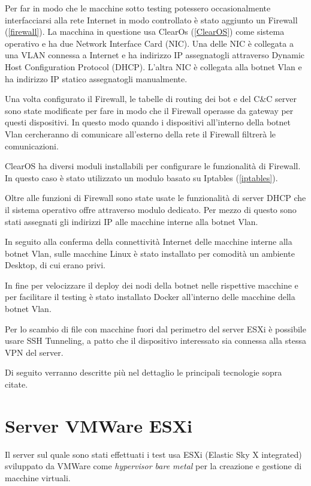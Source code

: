 Per far in modo che le macchine sotto testing potessero occasionalmente interfacciarsi alla rete Internet in modo controllato è stato aggiunto un Firewall (\ref{firewall}). La macchina in questione usa  ClearOs (\ref{ClearOS}) come sistema operativo e ha due Network Interface Card (NIC).
Una delle NIC è collegata a una VLAN connessa a Internet e ha indirizzo IP assegnatogli attraverso Dynamic Host Configuration Protocol (DHCP). L'altra NIC è collegata alla botnet Vlan e ha indirizzo IP statico assegnatogli manualmente. 

Una volta configurato il Firewall, le tabelle di routing dei bot e del C\&C server sono state modificate per fare in modo che il Firewall operasse da gateway per questi dispositivi. In questo modo quando i dispositivi all'interno della botnet Vlan cercheranno di comunicare all'esterno della rete il Firewall filtrerà le comunicazioni.

ClearOS ha diversi moduli installabili per configurare le funzionalità di Firewall. In questo caso è stato utilizzato un modulo basato su Iptables (\ref{iptables}).
    
Oltre alle funzioni di Firewall sono state usate le funzionalità di server DHCP che il sistema operativo offre attraverso modulo dedicato. Per mezzo di  questo sono stati assegnati gli indirizzi IP alle macchine interne alla botnet Vlan.

In seguito alla conferma della connettività  Internet delle macchine interne alla botnet Vlan,  sulle macchine Linux è stato installato per comodità un ambiente Desktop, di cui erano privi.

In fine per velocizzare il deploy dei nodi della botnet nelle rispettive macchine  e per facilitare il testing è stato installato Docker all'interno delle macchine della  botnet Vlan.

Per lo scambio di file con macchine fuori dal perimetro del server ESXi è possibile usare SSH Tunneling, a patto che il dispositivo interessato sia connessa alla stessa VPN del server.
    
Di seguito verranno descritte più nel dettaglio le principali tecnologie sopra citate.

\section{Server VMWare ESXi}
\label{esxi}
Il server sul quale sono stati effettuati i test usa  ESXi (Elastic Sky X integrated) \cite{esxi} sviluppato da VMWare come \textit{hypervisor bare metal} per la creazione e  gestione di macchine virtuali.


